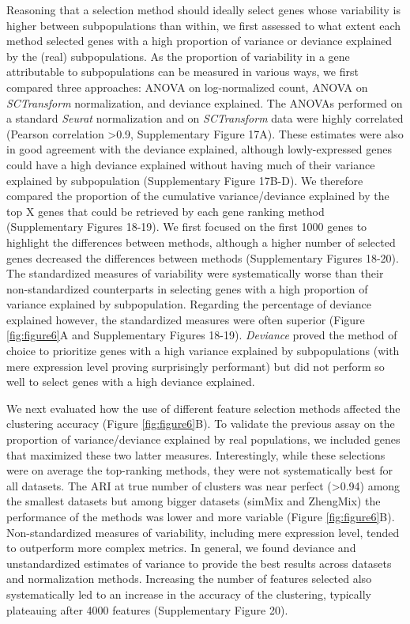 \documentclass{bmcart}
\begin{document}
Reasoning that a selection method should ideally select genes whose variability is higher between subpopulations than within, we first assessed to what extent each method selected genes with a high proportion of variance or deviance explained by the (real) subpopulations. As the proportion of variability in a gene attributable to subpopulations can be measured in various ways, we first compared three approaches: ANOVA on log-normalized count, ANOVA on \textit{SCTransform} normalization, and deviance explained. The ANOVAs performed on a standard \textit{Seurat} normalization and on \textit{SCTransform} data were highly correlated (Pearson correlation >0.9, Supplementary Figure 17A). These estimates were also in good agreement with the deviance explained, although lowly-expressed genes could have a high deviance explained without having much of their variance explained by subpopulation (Supplementary Figure 17B-D). We therefore compared the proportion of the cumulative variance/deviance explained by the top X genes that could be retrieved by each gene ranking method (Supplementary Figures 18-19). We first focused on the first 1000 genes to highlight the differences between methods, although a higher number of selected genes decreased the differences between methods (Supplementary Figures 18-20). The standardized measures of variability were systematically worse than their non-standardized counterparts in selecting genes with a high proportion of variance explained by subpopulation. Regarding the percentage of deviance explained however, the standardized measures were often superior (Figure \ref{fig:figure6}A and Supplementary Figures 18-19). \textit{Deviance} proved the method of choice to prioritize genes with a high variance explained by subpopulations (with mere expression level proving surprisingly performant) but did not perform so well to select genes with a high deviance explained.

We next evaluated how the use of different feature selection methods affected the clustering accuracy (Figure \ref{fig:figure6}B). To validate the previous assay on the proportion of variance/deviance explained by real populations, we included genes that maximized these two latter measures. Interestingly, while these selections were on average the top-ranking methods, they were not systematically best for all datasets. The ARI at true number of clusters was near perfect (>0.94) among the smallest datasets but among bigger datasets (simMix and ZhengMix) the performance of the methods was lower and more variable (Figure \ref{fig:figure6}B). Non-standardized measures of variability, including mere expression level, tended to outperform more complex metrics. In general, we found deviance and unstandardized estimates of variance to provide the best results across datasets and normalization methods. Increasing the number of features selected also systematically led to an increase in the accuracy of the clustering, typically plateauing after 4000 features (Supplementary Figure 20).
\end{document}
